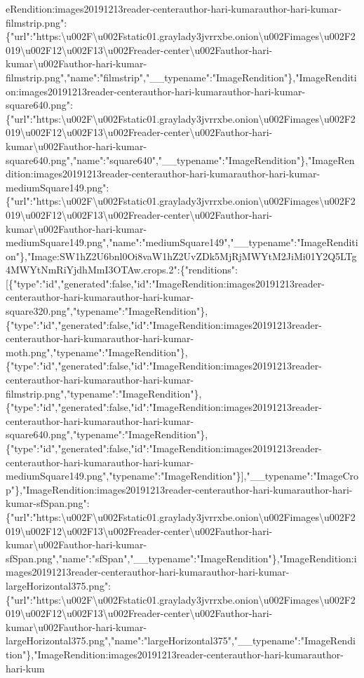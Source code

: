 eRendition:images20191213reader-centerauthor-hari-kumarauthor-hari-kumar-filmstrip.png":\{"url":"https:\textbackslash{}u002F\textbackslash{}u002Fstatic01.graylady3jvrrxbe.onion\textbackslash{}u002Fimages\textbackslash{}u002F2019\textbackslash{}u002F12\textbackslash{}u002F13\textbackslash{}u002Freader-center\textbackslash{}u002Fauthor-hari-kumar\textbackslash{}u002Fauthor-hari-kumar-filmstrip.png","name":"filmstrip","\_\_typename":"ImageRendition"\},"ImageRendition:images20191213reader-centerauthor-hari-kumarauthor-hari-kumar-square640.png":\{"url":"https:\textbackslash{}u002F\textbackslash{}u002Fstatic01.graylady3jvrrxbe.onion\textbackslash{}u002Fimages\textbackslash{}u002F2019\textbackslash{}u002F12\textbackslash{}u002F13\textbackslash{}u002Freader-center\textbackslash{}u002Fauthor-hari-kumar\textbackslash{}u002Fauthor-hari-kumar-square640.png","name":"square640","\_\_typename":"ImageRendition"\},"ImageRendition:images20191213reader-centerauthor-hari-kumarauthor-hari-kumar-mediumSquare149.png":\{"url":"https:\textbackslash{}u002F\textbackslash{}u002Fstatic01.graylady3jvrrxbe.onion\textbackslash{}u002Fimages\textbackslash{}u002F2019\textbackslash{}u002F12\textbackslash{}u002F13\textbackslash{}u002Freader-center\textbackslash{}u002Fauthor-hari-kumar\textbackslash{}u002Fauthor-hari-kumar-mediumSquare149.png","name":"mediumSquare149","\_\_typename":"ImageRendition"\},"Image:SW1hZ2U6bnl0Oi8vaW1hZ2UvZDk5MjRjMWYtM2JiMi01Y2Q5LTg4MWYtNmRiYjdhMmI3OTAw.crops.2":\{"renditions":{[}\{"type":"id","generated":false,"id":"ImageRendition:images20191213reader-centerauthor-hari-kumarauthor-hari-kumar-square320.png","typename":"ImageRendition"\},\{"type":"id","generated":false,"id":"ImageRendition:images20191213reader-centerauthor-hari-kumarauthor-hari-kumar-moth.png","typename":"ImageRendition"\},\{"type":"id","generated":false,"id":"ImageRendition:images20191213reader-centerauthor-hari-kumarauthor-hari-kumar-filmstrip.png","typename":"ImageRendition"\},\{"type":"id","generated":false,"id":"ImageRendition:images20191213reader-centerauthor-hari-kumarauthor-hari-kumar-square640.png","typename":"ImageRendition"\},\{"type":"id","generated":false,"id":"ImageRendition:images20191213reader-centerauthor-hari-kumarauthor-hari-kumar-mediumSquare149.png","typename":"ImageRendition"\}{]},"\_\_typename":"ImageCrop"\},"ImageRendition:images20191213reader-centerauthor-hari-kumarauthor-hari-kumar-sfSpan.png":\{"url":"https:\textbackslash{}u002F\textbackslash{}u002Fstatic01.graylady3jvrrxbe.onion\textbackslash{}u002Fimages\textbackslash{}u002F2019\textbackslash{}u002F12\textbackslash{}u002F13\textbackslash{}u002Freader-center\textbackslash{}u002Fauthor-hari-kumar\textbackslash{}u002Fauthor-hari-kumar-sfSpan.png","name":"sfSpan","\_\_typename":"ImageRendition"\},"ImageRendition:images20191213reader-centerauthor-hari-kumarauthor-hari-kumar-largeHorizontal375.png":\{"url":"https:\textbackslash{}u002F\textbackslash{}u002Fstatic01.graylady3jvrrxbe.onion\textbackslash{}u002Fimages\textbackslash{}u002F2019\textbackslash{}u002F12\textbackslash{}u002F13\textbackslash{}u002Freader-center\textbackslash{}u002Fauthor-hari-kumar\textbackslash{}u002Fauthor-hari-kumar-largeHorizontal375.png","name":"largeHorizontal375","\_\_typename":"ImageRendition"\},"ImageRendition:images20191213reader-centerauthor-hari-kumarauthor-hari-kum
